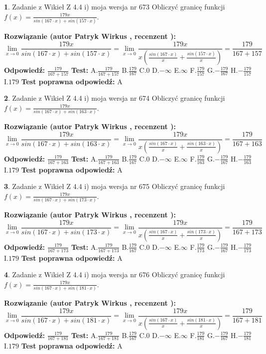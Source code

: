 \documentclass[12pt, a4paper]{article}
\theoremstyle{definition} %
\newtheorem{zad}{}
\newcommand{\zadStart}[1]{\begin{zad}#1\newline}
\newcommand{\zadStop}{\end{zad}}
\newcommand{\rozwStart}[2]{\noindent \textbf{Rozwiązanie (autor #1 , recenzent #2): }\newline}
\newcommand{\rozwStop}{\newline}
\newcommand{\odpStart}{\noindent \textbf{Odpowiedź:}\newline}
\newcommand{\odpStop}{\newline}
\newcommand{\testStart}{\noindent \textbf{Test:}\newline}
\newcommand{\testStop}{\newline}
\newcommand{\kluczStart}{\noindent \textbf{Test poprawna odpowiedź:}\newline}
\newcommand{\kluczStop}{\newline}
\begin{document}
\zadStart{Zadanie z Wikieł Z 4.4 i) moja wersja nr 673}
Obliczyć granicę funkcji $f(x)=\frac{179x}{sin(167\cdot x) +sin(157\cdot x)}$.
\zadStop
\rozwStart{Patryk Wirkus}{}
$$\lim\limits_{x\to 0}\frac{179x}{sin(167\cdot x) +sin(157\cdot x)}=\lim\limits_{x\to 0}\frac{179x}{x(\frac{sin(167\cdot x)}{x}+\frac{sin(157\cdot x)}{x})}=\frac{179}{167+157}$$
\rozwStop
\odpStart
$\frac{179}{167+157}$
\odpStop
\testStart
A.$\frac{179}{167+157}$
B.$\frac{179}{167}$
C.$0$
D.$-\infty$
E.$\infty$
F.$\frac{179}{157}$
G.$-\frac{179}{167}$
H.$-\frac{179}{157}$
I.$179$
\testStop
\kluczStart
A
\kluczStop



\zadStart{Zadanie z Wikieł Z 4.4 i) moja wersja nr 674}
Obliczyć granicę funkcji $f(x)=\frac{179x}{sin(167\cdot x) +sin(163\cdot x)}$.
\zadStop
\rozwStart{Patryk Wirkus}{}
$$\lim\limits_{x\to 0}\frac{179x}{sin(167\cdot x) +sin(163\cdot x)}=\lim\limits_{x\to 0}\frac{179x}{x(\frac{sin(167\cdot x)}{x}+\frac{sin(163\cdot x)}{x})}=\frac{179}{167+163}$$
\rozwStop
\odpStart
$\frac{179}{167+163}$
\odpStop
\testStart
A.$\frac{179}{167+163}$
B.$\frac{179}{167}$
C.$0$
D.$-\infty$
E.$\infty$
F.$\frac{179}{163}$
G.$-\frac{179}{167}$
H.$-\frac{179}{163}$
I.$179$
\testStop
\kluczStart
A
\kluczStop



\zadStart{Zadanie z Wikieł Z 4.4 i) moja wersja nr 675}
Obliczyć granicę funkcji $f(x)=\frac{179x}{sin(167\cdot x) +sin(173\cdot x)}$.
\zadStop
\rozwStart{Patryk Wirkus}{}
$$\lim\limits_{x\to 0}\frac{179x}{sin(167\cdot x) +sin(173\cdot x)}=\lim\limits_{x\to 0}\frac{179x}{x(\frac{sin(167\cdot x)}{x}+\frac{sin(173\cdot x)}{x})}=\frac{179}{167+173}$$
\rozwStop
\odpStart
$\frac{179}{167+173}$
\odpStop
\testStart
A.$\frac{179}{167+173}$
B.$\frac{179}{167}$
C.$0$
D.$-\infty$
E.$\infty$
F.$\frac{179}{173}$
G.$-\frac{179}{167}$
H.$-\frac{179}{173}$
I.$179$
\testStop
\kluczStart
A
\kluczStop



\zadStart{Zadanie z Wikieł Z 4.4 i) moja wersja nr 676}
Obliczyć granicę funkcji $f(x)=\frac{179x}{sin(167\cdot x) +sin(181\cdot x)}$.
\zadStop
\rozwStart{Patryk Wirkus}{}
$$\lim\limits_{x\to 0}\frac{179x}{sin(167\cdot x) +sin(181\cdot x)}=\lim\limits_{x\to 0}\frac{179x}{x(\frac{sin(167\cdot x)}{x}+\frac{sin(181\cdot x)}{x})}=\frac{179}{167+181}$$
\rozwStop
\odpStart
$\frac{179}{167+181}$
\odpStop
\testStart
A.$\frac{179}{167+181}$
B.$\frac{179}{167}$
C.$0$
D.$-\infty$
E.$\infty$
F.$\frac{179}{181}$
G.$-\frac{179}{167}$
H.$-\frac{179}{181}$
I.$179$
\testStop
\kluczStart
A
\kluczStop
\end{document}
